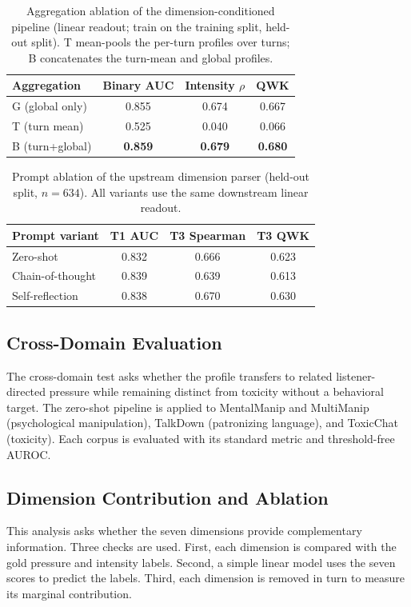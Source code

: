 \documentclass[conference]{IEEEtran}
\begin{document}
\begin{table}[t]
\centering
\caption{Aggregation ablation of the dimension-conditioned pipeline
(linear readout; train on the training split, held-out split). T mean-pools the
per-turn profiles over turns; B concatenates the turn-mean and global
profiles.}
\label{tab:agg}
\footnotesize
\begin{tabular}{@{}lccc@{}}
\toprule
\textbf{Aggregation} & \textbf{Binary AUC} & \textbf{Intensity $\rho$} & \textbf{QWK}\\
\midrule
G (global only) & 0.855 & 0.674 & 0.667\\
T (turn mean) & 0.525 & 0.040 & 0.066\\
B (turn+global) & \textbf{0.859} & \textbf{0.679} & \textbf{0.680}\\
\bottomrule
\end{tabular}
\end{table}

\begin{table}[t]
\centering
\caption{Prompt ablation of the upstream dimension parser (held-out
split, $n{=}634$). All variants use the same downstream linear readout.}
\label{tab:prompt}
\footnotesize
\begin{tabular}{@{}lccc@{}}
\toprule
\textbf{Prompt variant} & \textbf{T1 AUC} & \textbf{T3 Spearman} & \textbf{T3 QWK}\\
\midrule
Zero-shot & 0.832 & 0.666 & 0.623\\
Chain-of-thought & 0.839 & 0.639 & 0.613\\
Self-reflection & 0.838 & 0.670 & 0.630\\
\bottomrule
\end{tabular}
\end{table}

\subsection{Cross-Domain Evaluation}
The cross-domain test asks whether the profile transfers to related
listener-directed pressure while remaining distinct from toxicity without a
behavioral target. The zero-shot pipeline is applied to MentalManip and
MultiManip (psychological manipulation), TalkDown (patronizing language), and
ToxicChat (toxicity). Each corpus is evaluated with its standard metric and
threshold-free AUROC.

\subsection{Dimension Contribution and Ablation}
This analysis asks whether the seven dimensions provide complementary
information. Three checks are used. First, each dimension is compared with
the gold pressure and intensity labels. Second, a simple linear model uses
the seven scores to predict the labels. Third, each dimension is removed in
turn to measure its marginal contribution.
\end{document}
